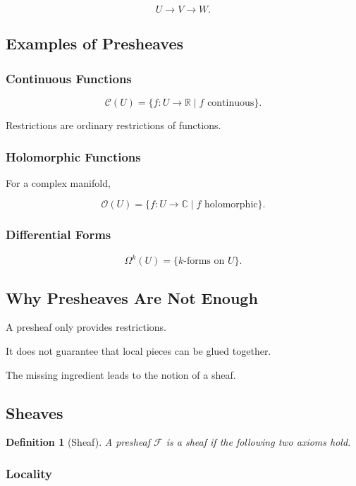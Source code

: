 \documentclass[12pt,a4paper]{article}
\theoremstyle{notespace}
\newtheorem{definition}{Definition}[subsection]
\begin{document}
\[
U\to V\to W.
\]

\subsection{Examples of Presheaves}

\subsubsection*{Continuous Functions}

\[
\mathcal C(U)
=
\{f:U\to\mathbb R \mid f \text{ continuous}\}.
\]

Restrictions are ordinary restrictions of functions.

\bigskip

\subsubsection*{Holomorphic Functions}

For a complex manifold,

\[
\mathcal O(U)
=
\{f:U\to\mathbb C \mid f \text{ holomorphic}\}.
\]

\bigskip

\subsubsection*{Differential Forms}

\[
\Omega^k(U)
=
\{\text{$k$-forms on }U\}.
\]

\subsection{Why Presheaves Are Not Enough}

A presheaf only provides restrictions.

It does not guarantee that local pieces can be glued together.

The missing ingredient leads to the notion of a sheaf.

\subsection{Sheaves}

\begin{definition}[Sheaf]
	A presheaf \(\mathcal F\) is a \emph{sheaf} if the following two axioms hold.
\end{definition}

\subsubsection*{Locality}
\end{document}
